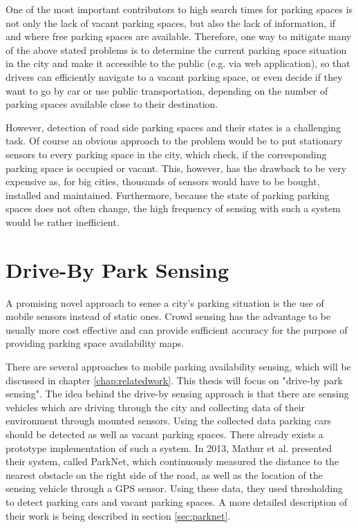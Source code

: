 One of the most important contributors to high search times for parking spaces is not only the lack of vacant parking spaces, but also the lack of information, if and where free parking spaces are available. Therefore, one way to mitigate many of the above stated problems is to determine the current parking space situation in the city and make it accessible to the public (e.g. via web application), so that drivers can efficiently navigate to a vacant parking space, or even decide if they want to go by car or use public transportation, depending on the number of parking spaces available close to their destination. 

However, detection of road side parking spaces and their states is a challenging task. Of course an obvious approach to the problem would be to put stationary sensors to every parking space in the city, which check, if the corresponding parking space is occupied or vacant. This, however, has the drawback to be very expensive as, for big cities, thousands of sensors would have to be bought, installed and maintained. Furthermore, because the state of parking parking spaces does not often change, the high frequency of sensing with such a system would be rather inefficient.





\section{Drive-By Park Sensing}

A promising novel approach to sense a city's parking situation is the use of mobile sensors instead of static ones. Crowd sensing has the advantage to be usually more cost effective and can provide sufficient accuracy for the purpose of providing parking space availability maps.

There are several approaches to mobile parking availability sensing, which will be discussed in chapter \ref{chap:relatedwork}. This thesis will focus on "drive-by park sensing". The idea behind the drive-by sensing approach is that there are sensing vehicles which are driving through the city and collecting data of their environment through mounted sensors. Using the collected data parking cars should be detected as well as vacant parking spaces. There already exists a prototype implementation of such a system. In 2013, Mathur et al. \cite{Mathur:2010:PDS:1814433.1814448} presented their system, called ParkNet, which continuously measured the distance to the nearest obstacle on the right side of the road, as well as the location of the sensing vehicle through a GPS sensor. Using these data, they used thresholding to detect parking cars and vacant parking spaces. A more detailed description of their work is being described in section \ref{sec:parknet}.

